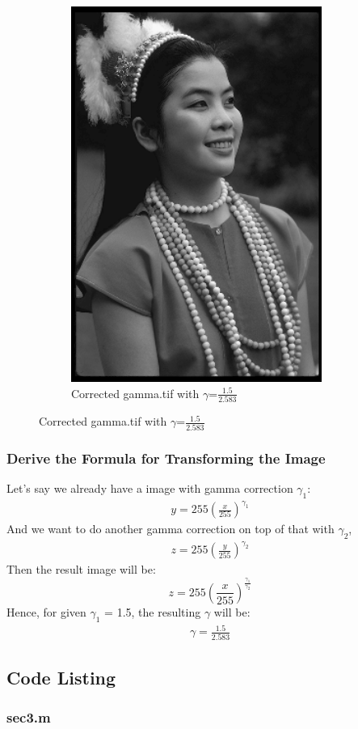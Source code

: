 \documentclass{article}
\begin{document}
\begin{figure}[h]
\begin{subfigure}{0.5\textwidth}
				\includegraphics[width=0.9\textwidth]{gamma15_gamma.png}
				\caption{Corrected gamma.tif with $\gamma$=$\frac{1.5}{2.583}$}
			\end{subfigure}
		\end{figure}

	\subsubsection{Derive the Formula for Transforming the Image}
		Let's say we already have a image with gamma correction $\gamma_{1}$:
		\begin{align*}
			y = 255(\frac{x}{255})^{\gamma_{1}}
		\end{align*}
		And we want to do another gamma correction on top of that with
		$\gamma_{2}$,
		\begin{align*}
			z = 255(\frac{y}{255})^{\gamma_{2}}
		\end{align*}
		Then the result image will be:
		\begin{equation}
			z = 255(\frac{x}{255})^{\frac{\gamma_{1}}{\gamma_{2}}}
		\end{equation}
		Hence, for given $\gamma_{1}$ = 1.5, the resulting $\gamma$ will be:
		\begin{align*}
			\gamma = \frac{1.5}{2.583}
		\end{align*}

\subsection{Code Listing}
	\subsubsection{sec3.m}
		\inputminted[tabsize=4,breaklines]{matlab}{sec4.m}
\end{document}
